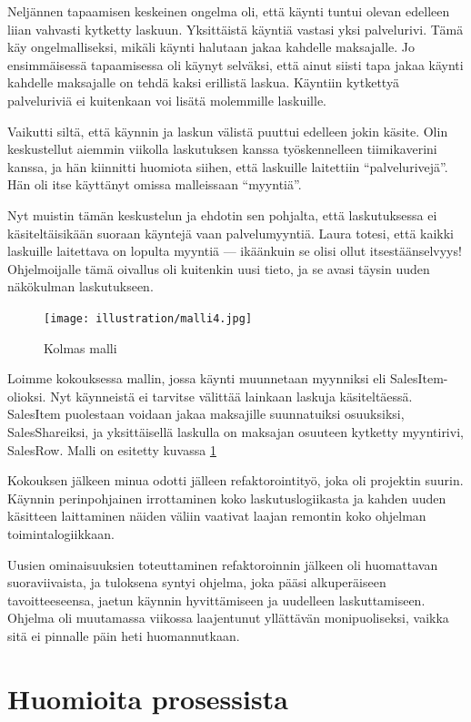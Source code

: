 Neljännen tapaamisen keskeinen ongelma oli, että käynti tuntui olevan
edelleen liian vahvasti kytketty laskuun. Yksittäistä käyntiä vastasi
yksi palvelurivi. Tämä käy ongelmalliseksi, mikäli käynti halutaan jakaa
kahdelle maksajalle. Jo ensimmäisessä tapaamisessa oli käynyt selväksi,
että ainut siisti tapa jakaa käynti kahdelle maksajalle on tehdä kaksi
erillistä laskua. Käyntiin kytkettyä palveluriviä ei kuitenkaan voi
lisätä molemmille laskuille.

Vaikutti siltä, että käynnin ja laskun välistä puuttui edelleen jokin
käsite. Olin keskustellut aiemmin viikolla laskutuksen kanssa
työskennelleen tiimikaverini kanssa, ja hän kiinnitti huomiota siihen,
että laskuille laitettiin ``palvelurivejä''. Hän oli itse käyttänyt
omissa malleissaan ``myyntiä''.

Nyt muistin tämän keskustelun ja ehdotin sen pohjalta, että
laskutuksessa ei käsiteltäisikään suoraan käyntejä vaan palvelumyyntiä.
Laura totesi, että kaikki laskuille laitettava on lopulta myyntiä ---
ikäänkuin se olisi ollut itsestäänselvyys! Ohjelmoijalle tämä oivallus
oli kuitenkin uusi tieto, ja se avasi täysin uuden näkökulman
laskutukseen.

\begin{figure}
\centering
\texttt{[image: illustration/malli4.jpg]}
\caption{\label{malli3}Kolmas malli}
\end{figure}

Loimme kokouksessa mallin, jossa käynti muunnetaan myynniksi eli
SalesItem-olioksi. Nyt käynneistä ei tarvitse välittää lainkaan laskuja
käsiteltäessä. SalesItem puolestaan voidaan jakaa maksajille
suunnatuiksi osuuksiksi, SalesShareiksi, ja yksittäisellä laskulla on
maksajan osuuteen kytketty myyntirivi, SalesRow. Malli on esitetty
kuvassa \ref{malli3}

Kokouksen jälkeen minua odotti jälleen refaktorointityö, joka oli
projektin suurin. Käynnin perinpohjainen irrottaminen koko
laskutuslogiikasta ja kahden uuden käsitteen laittaminen näiden väliin
vaativat laajan remontin koko ohjelman toimintalogiikkaan.

Uusien ominaisuuksien toteuttaminen refaktoroinnin jälkeen oli
huomattavan suoraviivaista, ja tuloksena syntyi ohjelma, joka pääsi
alkuperäiseen tavoitteeseensa, jaetun käynnin hyvittämiseen ja uudelleen
laskuttamiseen. Ohjelma oli muutamassa viikossa laajentunut yllättävän
monipuoliseksi, vaikka sitä ei pinnalle päin heti huomannutkaan.

\hypertarget{huomioita-prosessista}{%
\section{Huomioita prosessista}\label{huomioita-prosessista}}

